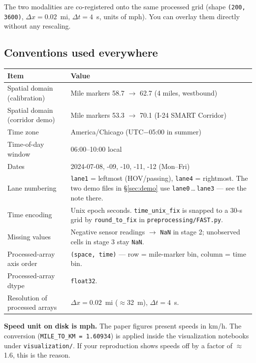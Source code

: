 \documentclass[11pt]{article}
\newcommand{\code}[1]{\texttt{#1}}
\newcommand{\nan}{\code{NaN}}
\begin{document}
\begin{tipbox}
The two modalities are co-registered onto the same processed grid (shape
\code{(200, 3600)}, $\Delta x = 0.02$~mi, $\Delta t = 4$~s, units of mph). You
can overlay them directly without any rescaling.
\end{tipbox}

\subsection{Conventions used everywhere}

\begin{tabularx}{\textwidth}{l X}
\toprule
\textbf{Item} & \textbf{Value} \\
\midrule
Spatial domain (calibration)    & Mile markers 58.7 $\to$ 62.7 (4 miles, westbound) \\
Spatial domain (corridor demo)  & Mile markers 53.3 $\to$ 70.1 (I-24 SMART Corridor) \\
Time zone                       & America/Chicago (UTC$-$05:00 in summer) \\
Time-of-day window              & 06:00--10:00 local \\
Dates                           & 2024-07-08, -09, -10, -11, -12 (Mon--Fri) \\
Lane numbering                  & \code{lane1} = leftmost (HOV/passing), \code{lane4} = rightmost. The two demo files in \S\ref{sec:demo} use \code{lane0}\,\dots\,\code{lane3} --- see the note there. \\
Time encoding                   & Unix epoch seconds. \code{time\_unix\_fix} is snapped to a 30-s grid by \code{round\_to\_fix} in \code{preprocessing/FAST.py}. \\
Missing values                  & Negative sensor readings $\to$ \nan{} in stage 2; unobserved cells in stage 3 stay \nan{}. \\
Processed-array axis order      & \code{(space, time)} --- row = mile-marker bin, column = time bin. \\
Processed-array dtype           & \code{float32}. \\
Resolution of processed arrays  & $\Delta x = 0.02$~mi ($\approx$32~m), $\Delta t = 4$~s. \\
\bottomrule
\end{tabularx}

\begin{warnbox}
\textbf{Speed unit on disk is mph.} The paper figures present speeds in
km/h. The conversion (\code{MILE\_TO\_KM = 1.60934}) is applied inside the
visualization notebooks under \code{visualization/}. If your reproduction
shows speeds off by a factor of $\approx$1.6, this is the reason.
\end{warnbox}
\end{document}
